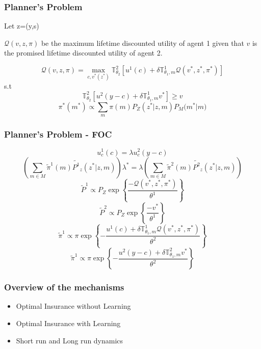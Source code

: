 \documentclass{beamer}
\begin{document}
\begin{frame}
\frametitle{Planner's Problem}
Let z=(y,s)

$\mathcal{Q}(v,z,\pi)$ be the maximum lifetime discounted utility of agent 1 given that $v$ is the promised lifetime discounted utility of agent 2.

\[\mathcal{Q}(v,z,\pi)=\max_{c,v^*(z^*)} \mathbb{T}_{\theta_2}^{2}\left[u^1(c)+\delta \mathbb{T}_{\theta_1,m}^{1} \mathcal{Q}(v^*,z^*,\pi^*)\right]\]
s.t
\[\mathbb{T}_{\theta_2}^2\left[u^2(y-c)+\delta \mathbb{T}_{\theta_1,m}^{1} v^*\right]\geq v\] 
\[\pi^{*}(m^*)\propto \sum_{m}{\pi(m) P_Z(z^*|z,m)P_M(m^*}|m)\]
\end{frame}
\begin{frame}
\frametitle{Planner's Problem - FOC}
\small{
\[u^1_c(c)=\lambda u^2_c(y-c)\]	
\[\left(\sum_{m \in M}\tilde{\pi}^1(m)\tilde{P^1}_z(z^* |z,m)\right)\lambda^*=\lambda\left(\sum_{m \in M}\tilde{\pi}^2(m)\tilde{P^2}_z(z^* |z,m)\right) \]
\[\tilde{P}^1 \propto P_Z\exp\left\{\frac{-\mathcal{Q}(v^*,z^*,\pi^*)}{\theta^1}\right\}\]
\[\tilde{P}^2 \propto P_Z\exp\left\{\frac{-v^*}{\theta^1}\right\}\]
\[\tilde{\pi}^1 \propto \pi \exp\left\{-\frac{ u^1(c)+\delta \mathbb{T}^1_{\theta_1,m} \mathcal{Q}(v^*,z^*,\pi^*) }{\theta^2}\right\}\]
\[\tilde{\pi}^1 \propto \pi \exp\left\{-\frac{u^2(y-c)+\delta \mathbb{T}^2_{\theta_1,m} v^*}{\theta^2}\right\}\]
}
\end{frame}


\begin{frame}
\frametitle{Overview of the mechanisms}
\begin{itemize}
	\item Optimal Insurance without Learning
	\item Optimal Insurance with Learning 
	\item Short run and Long run dynamics
\end{itemize}
\end{frame}
\end{document}

